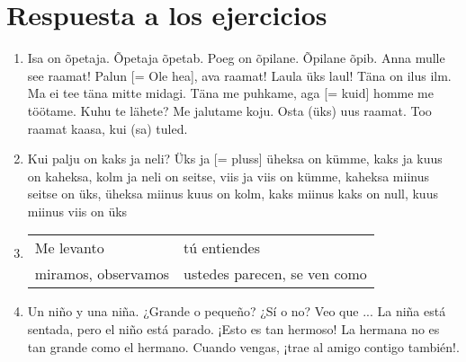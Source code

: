 \Large{\section*{Respuesta a los ejercicios}}

\begin{enumerate}
	\item Isa on õpetaja. Õpetaja õpetab. Poeg on õpilane. Õpilane õpib. Anna mulle see raamat! Palun [= Ole hea], ava raamat! Laula üks laul! Täna on ilus ilm. Ma ei tee täna mitte midagi. Täna me puhkame, aga [= kuid] homme me töötame. Kuhu te lähete? Me jalutame koju. Osta (üks) uus raamat. Too raamat kaasa, kui (sa) tuled.

	\item Kui palju on kaks ja neli? Üks ja [= pluss] üheksa on kümme, kaks ja kuus on kaheksa, kolm ja neli on seitse, viis ja viis on kümme, kaheksa miinus seitse on üks, üheksa miinus kuus on kolm, kaks miinus kaks on null, kuus miinus viis on üks

	\item 
		\begin{tabular}{ l l }
			Me levanto 			& tú entiendes \\
			miramos, observamos & ustedes parecen, se ven como  
		\end{tabular}

	\item Un niño y una niña. ¿Grande o pequeño? ¿Sí o no? Veo que ... La niña está sentada, pero el niño está parado. ¡Esto es tan hermoso! La hermana no es tan grande como el hermano. Cuando vengas, ¡trae al amigo contigo también!.
\end{enumerate}

